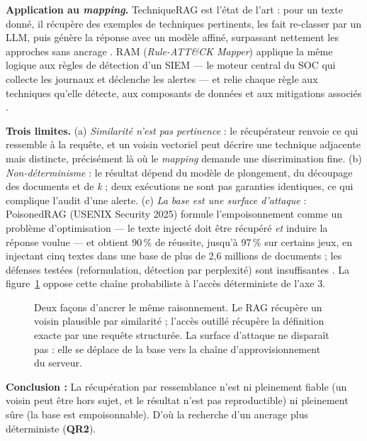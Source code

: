 \textbf{Application au \emph{mapping}.} TechniqueRAG est l'état de l'art : pour un texte donné, il récupère des exemples de techniques pertinents, les fait re-classer par un LLM, puis génère la réponse avec un modèle affiné, surpassant nettement les approches sans ancrage \cite{techniquerag}. RAM (\emph{Rule-ATT\&CK Mapper}) applique la même logique aux règles de détection d'un SIEM --- le moteur central du SOC qui collecte les journaux et déclenche les alertes --- et relie chaque règle aux techniques qu'elle détecte, aux composants de données et aux mitigations associés \cite{ram}.

\textbf{Trois limites.} (a) \emph{Similarité n'est pas pertinence} : le récupérateur renvoie ce qui ressemble à la requête, et un voisin vectoriel peut décrire une technique adjacente mais distincte, précisément là où le \emph{mapping} demande une discrimination fine. (b) \emph{Non-déterminisme} : le résultat dépend du modèle de plongement, du découpage des documents et de \emph{k} ; deux exécutions ne sont pas garanties identiques, ce qui complique l'audit d'une alerte. (c) \emph{La base est une surface d'attaque} : PoisonedRAG (USENIX Security 2025) formule l'empoisonnement comme un problème d'optimisation --- le texte injecté doit être récupéré \emph{et} induire la réponse voulue --- et obtient 90\,\% de réussite, jusqu'à 97\,\% sur certains jeux, en injectant cinq textes dans une base de plus de 2,6 millions de documents ; les défenses testées (reformulation, détection par perplexité) sont insuffisantes \cite{poisonedrag}. La figure~\ref{fig:rag-outils} oppose cette chaîne probabiliste à l'accès déterministe de l'axe 3.

\begin{figure}[htbp]
\centering
{}
\caption{Deux façons d'ancrer le même raisonnement. Le RAG récupère un voisin plausible par similarité ; l'accès outillé récupère la définition exacte par une requête structurée. La surface d'attaque ne disparaît pas : elle se déplace de la base vers la chaîne d'approvisionnement du serveur.}\label{fig:rag-outils}
\end{figure}

\begin{encadre}
\textbf{Conclusion :} La récupération par ressemblance n'est ni pleinement fiable (un voisin peut être hors sujet, et le résultat n'est pas reproductible) ni pleinement sûre (la base est empoisonnable). D'où la recherche d'un ancrage plus déterministe (\textbf{QR2}).
\end{encadre}

